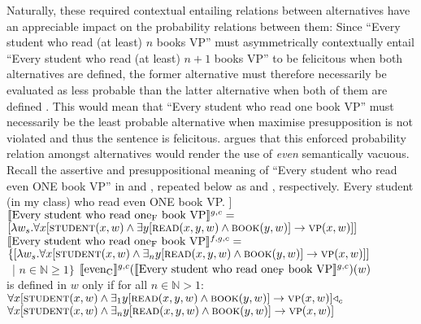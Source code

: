 Naturally, these required contextual entailing relations between alternatives have an appreciable impact on the probability relations between them: Since \enquote{Every student who read (at least) $n$ books VP} must asymmetrically contextually entail \enquote{Every student who read (at least) $n+1$ books VP} to be felicitous when both alternatives are defined, the former alternative must therefore necessarily be evaluated as less probable than the latter alternative \parencite{Kolmogorov1933} when both of them are defined \parencite[p.~135]{Crnic2014-dogma}. This would mean that \enquote{Every student who read one book VP} must necessarily be the least probable alternative when maximise presupposition is not violated and thus the sentence is felicitous. \textcite{Crnic2014-dogma} argues that this enforced probability relation amongst alternatives would render the use of \textit{even} semantically vacuous. Recall the assertive and presuppositional meaning of \enquote{Every student who read even \MakeUppercase{one} book VP} in  and , repeated below as  and , respectively.
\pex[nopreamble=true]\label{ex:even-sdm-demo-repeat2}%
\a{} Every student (in my class) who read even \MakeUppercase{one} book VP.
\a[]\phantomsection [even\textsubscript{C} [every student who read one\textsubscript{F} book VP]]
\a{} $\intension[g,c]{Every student who read one\textsubscript{F} book VP}=$\\\emptyfill$[\lambda{w_s}.\forall{x}[\predicate{student}(x,w)\land\exists{y}[\predicate{read}(x,y,w)\land\predicate{book}(y,w)]\rightarrow\predicate{vp}(x,w)]]$
\a{} $\intension[f,g,c]{Every student who read one\textsubscript{F} book VP}=$\\$\{[\lambda{w_s}.\forall{x}[\predicate{student}(x,w)\land\exists_n{y}[\predicate{read}(x,y,w)\land\predicate{book}(y,w)]\rightarrow\predicate{vp}(x,w)]]$\\\emptyfill~| $n\in\mathbb{N}\geqslant1\}$
\a{} $\intension[g,c]{even\textsubscript{C}}(\intension[g,c]{Every student who read one\textsubscript{F} book VP})(w)$\\is defined in $w$ only if for all $n\in\mathbb{N}>1$:\\$\forall{x}[\predicate{student}(x,w)\land\exists_1{y}[\predicate{read}(x,y,w)\land\predicate{book}(y,w)]\rightarrow\predicate{vp}(x,w)]\lprob_c$\\\emptyfill$\forall{x}[\predicate{student}(x,w)\land\exists_n{y}[\predicate{read}(x,y,w)\land\predicate{book}(y,w)]\rightarrow\predicate{vp}(x,w)]$
